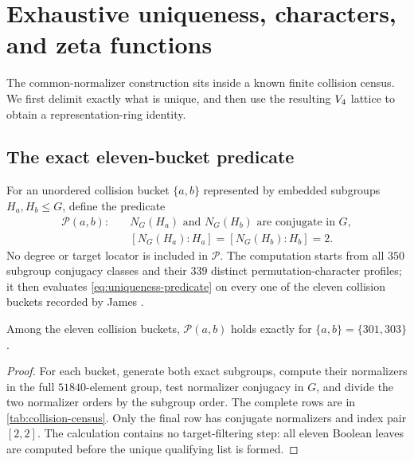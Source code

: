 \section{Exhaustive uniqueness, characters, and zeta functions}
\label{sec:uniqueness-zeta}

The common-normalizer construction sits inside a known finite collision
census.  We first delimit exactly what is unique, and then use the resulting
$V_4$ lattice to obtain a representation-ring identity.

\subsection{The exact eleven-bucket predicate}

For an unordered collision bucket $\{a,b\}$ represented by embedded
subgroups $H_a,H_b\le G$, define the predicate
\begin{equation}
\label{eq:uniqueness-predicate}
\begin{split}
\mathcal P(a,b):\quad &N_G(H_a)\text{ and }N_G(H_b)
     \text{ are conjugate in }G,\\
&[N_G(H_a):H_a]=[N_G(H_b):H_b]=2.
\end{split}
\end{equation}
No degree or target locator is included in $\mathcal P$.  The computation
starts from all $350$ subgroup conjugacy classes and their $339$ distinct
permutation-character profiles; it then evaluates \eqref{eq:uniqueness-predicate}
on every one of the eleven collision buckets recorded by James
\citep[\S3.1, printed p.~22]{james2022bayesian}.

\begin{proposition}
\label{prop:restricted-uniqueness}
Among the eleven collision buckets, $\mathcal P(a,b)$ holds exactly for
$\{a,b\}=\{301,303\}$.
\end{proposition}

\begin{proof}
For each bucket, generate both exact subgroups, compute their normalizers in
the full $51840$-element group, test normalizer conjugacy in $G$, and divide
the two normalizer orders by the subgroup order.  The complete rows are in
\cref{tab:collision-census}.  Only the final row has conjugate normalizers
and index pair $[2,2]$.  The calculation contains no target-filtering step:
all eleven Boolean leaves are computed before the unique qualifying list is
formed.
\end{proof}

